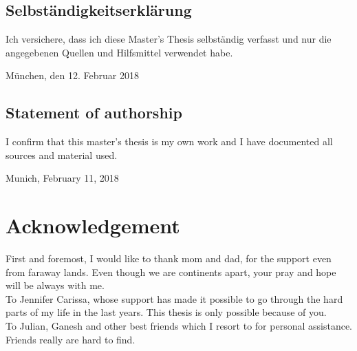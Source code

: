 \documentclass[pdftex,12pt,a4paper]{report}
\begin{document}

{\parindent 0cm

\vspace{80mm}
  
  \section*{Selbst\"andigkeitserkl\"arung}
  Ich versichere, dass ich diese Master's Thesis selbst\"andig verfasst und nur die angegebenen Quellen und Hilfsmittel verwendet habe.
  \vspace{3\baselineskip}
  
  M\"unchen, den 12. Februar 2018 \hspace{0.1\linewidth}\parbox{0.3\linewidth}{\dotfill}


\section*{Statement of authorship}
I confirm that this master's thesis is my own work and I have documented all sources and material used.

  \vspace{3\baselineskip}
  
  Munich, February 11, 2018  \hspace{0.1\linewidth}\parbox{0.3\linewidth}{\dotfill}
}

\newpage

\chapter*{Acknowledgement}

First and foremost, I would like to thank mom and dad, for the support even from faraway lands. Even though we are continents apart, your pray and hope will be always with me.\\

To Jennifer Carissa, whose support has made it possible to go through the hard parts of my life in the last years. This thesis is only possible because of you.\\

To Julian, Ganesh and other best friends which I resort to for personal assistance. Friends really are hard to find.\\
\end{document}
